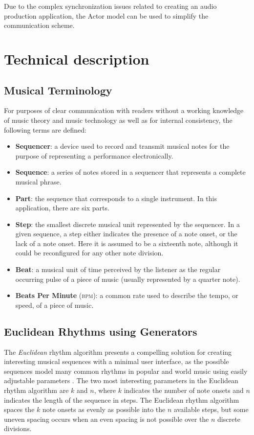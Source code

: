 \documentclass{sig-alternate-05-2015}
\begin{document}
Due to the complex synchronization issues related to creating an audio production application, the Actor model can be used to simplify the communication scheme. 

\section{Technical description}

\subsection{Musical Terminology}
For purposes of clear communication with readers without a working knowledge of music theory and music technology as well as for internal consistency, the following terms are defined:

\begin{itemize}
\item \textbf{Sequencer}: a device used to record and transmit musical notes for the purpose of representing a performance electronically.
\item \textbf{Sequence}: a series of notes stored in a sequencer that represents a complete musical phrase. 
\item \textbf{Part}: the sequence that corresponds to a single instrument. In this application, there are six parts.
\item \textbf{Step}: the smallest discrete musical unit represented by the sequencer. In a given sequence, a step either indicates the presence of a note onset, or the lack of a note onset. Here it is assumed to be a sixteenth note, although it could be reconfigured for any other note division. 
\item \textbf{Beat}:  a musical unit of time perceived by the listener as the regular occurring pulse of a piece of music (usually represented by a quarter note).
\item \textbf{Beats Per Minute} (\textsc{bpm}): a common rate used to describe the tempo, or speed, of a piece of music.
\end{itemize}

\subsection{Euclidean Rhythms using Generators}
The \textit{Euclidean} rhythm algorithm presents a compelling solution for creating interesting musical sequences with a minimal user interface, as the possible sequences model many common rhythms in popular and world music using easily adjustable parameters \cite{toussaint2005euclidean}. The two most interesting parameters in the Euclidean rhythm algorithm are $k$ and $n$, where $k$ indicates the number of note onsets and $n$ indicates the length of the sequence in steps. The Euclidean rhythm algorithm spaces the $k$ note onsets as evenly as possible into the $n$ available steps, but some uneven spacing occurs when an even spacing is not possible over the $n$ discrete divisions. 
\end{document}
